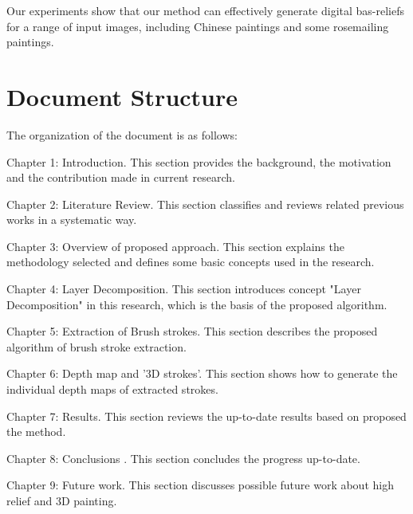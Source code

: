 Our experiments show that our method can effectively generate digital bas-reliefs for a range of input images, including Chinese paintings and some rosemailing paintings. 



\section{Document Structure}
The organization of the document is as follows:

Chapter 1: Introduction. This section provides the background, the motivation and the contribution made in current research.

Chapter 2: Literature Review. This section classifies and reviews related previous works  in a systematic way.

Chapter 3: Overview of proposed approach. This section explains the methodology selected and defines some basic concepts used in the research.

Chapter 4: Layer Decomposition. This section introduces concept "Layer Decomposition" in this research, which is the basis of the proposed algorithm.

Chapter 5: Extraction of Brush strokes. This section describes the proposed algorithm of brush stroke extraction.

Chapter 6: Depth map and '3D strokes'.  This section shows how to generate the individual depth maps of extracted strokes. 

Chapter 7: Results. This section reviews the up-to-date results based on proposed the method.

Chapter 8: Conclusions . This section concludes the progress up-to-date.

Chapter 9: Future work. This section discusses possible future work about high relief and 3D painting.

\newpage